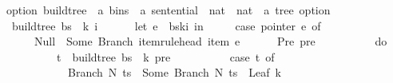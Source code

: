 \begin{isabellebody}
\isadelimproof
%
\endisadelimproof
%
\isatagproof
%
\endisatagproof
{\isafoldproof}%
%
\isadelimproof
%
\endisadelimproof
%
\isadelimdocument
%
\endisadelimdocument
%
\isatagdocument
%
\isamarkuptrue%
%
\endisatagdocument
{\isafolddocument}%
%
\isadelimdocument
%
\endisadelimdocument
{}\isamarkupfalse%
\ {\isacharparenleft}{\kern0pt}option{\isacharparenright}{\kern0pt}\ build{\isacharunderscore}{\kern0pt}tree{\isacharprime}{\kern0pt}\ {\isacharcolon}{\kern0pt}{\isacharcolon}{\kern0pt}\ {\isachardoublequoteopen}{\isacharprime}{\kern0pt}a\ bins\ {\isasymRightarrow}\ {\isacharprime}{\kern0pt}a\ sentential\ {\isasymRightarrow}\ nat\ {\isasymRightarrow}\ nat\ {\isasymRightarrow}\ {\isacharprime}{\kern0pt}a\ tree\ option{\isachardoublequoteclose}\ \isanewline
\ \ {\isachardoublequoteopen}build{\isacharunderscore}{\kern0pt}tree{\isacharprime}{\kern0pt}\ bs\ {\isasymomega}\ k\ i\ {\isacharequal}{\kern0pt}\ {\isacharparenleft}{\kern0pt}\isanewline
\ \ \ \ let\ e\ {\isacharequal}{\kern0pt}\ bs{\isacharbang}{\kern0pt}k{\isacharbang}{\kern0pt}i\ in\ {\isacharparenleft}{\kern0pt}\isanewline
\ \ \ \ case\ pointer\ e\ of\isanewline
\ \ \ \ \ \ Null\ {\isasymRightarrow}\ Some\ {\isacharparenleft}{\kern0pt}Branch\ {\isacharparenleft}{\kern0pt}item{\isacharunderscore}{\kern0pt}rule{\isacharunderscore}{\kern0pt}head\ {\isacharparenleft}{\kern0pt}item\ e{\isacharparenright}{\kern0pt}{\isacharparenright}{\kern0pt}\ {\isacharbrackleft}{\kern0pt}{\isacharbrackright}{\kern0pt}{\isacharparenright}{\kern0pt}\isanewline
\ \ \ \ {\isacharbar}{\kern0pt}\ Pre\ pre\ {\isasymRightarrow}\ {\isacharparenleft}{\kern0pt}\isanewline
\ \ \ \ \ \ \ \ do\ {\isacharbraceleft}{\kern0pt}\isanewline
\ \ \ \ \ \ \ \ \ \ t\ {\isasymleftarrow}\ build{\isacharunderscore}{\kern0pt}tree{\isacharprime}{\kern0pt}\ bs\ {\isasymomega}\ {\isacharparenleft}{\kern0pt}k{\isacharminus}{\kern0pt}{}{\isacharparenright}{\kern0pt}\ pre{\isacharsemicolon}{\kern0pt}\isanewline
\ \ \ \ \ \ \ \ \ \ case\ t\ of\isanewline
\ \ \ \ \ \ \ \ \ \ \ \ Branch\ N\ ts\ {\isasymRightarrow}\ Some\ {\isacharparenleft}{\kern0pt}Branch\ N\ {\isacharparenleft}{\kern0pt}ts\ {\isacharat}{\kern0pt}\ {\isacharbrackleft}{\kern0pt}Leaf\ {\isacharparenleft}{\kern0pt}{\isasymomega}{\isacharbang}{\kern0pt}{\isacharparenleft}{\kern0pt}k{\isacharminus}{\kern0pt}{}{\isacharparenright}{\kern0pt}{\isacharparenright}{\kern0pt}{\isacharbrackright}{\kern0pt}{\isacharparenright}{\kern0pt}{\isacharparenright}{\kern0pt}\isanewline

\end{isabellebody}
